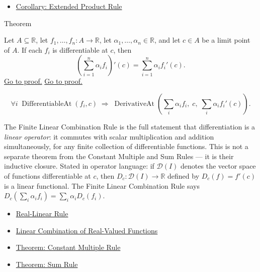 \begin{dependencies}
\begin{itemize}
  \item \hyperref[cor:extended-product-rule]{Corollary: Extended Product Rule}
\end{itemize}
\end{dependencies}


\begin{theorembox}{Theorem}
\begin{theorem}
\label{thm:finite-linear-combination-rule}
Let $A \subseteq \mathbb{R}$, let $f_1, \dots, f_n : A \to \mathbb{R}$, let $\alpha_1, \dots, \alpha_n \in \mathbb{R}$, and let $c \in A$ be a limit point of $A$. If each $f_i$ is differentiable at $c$, then
\[
\left(\sum_{i=1}^{n} \alpha_i f_i\right)'(c) = \sum_{i=1}^{n} \alpha_i f_i'(c).
\]
\hyperref[prf:finite-linear-combination]{Go to proof.}
\hyperref[prf:finite-linear-combination-rule]{Go to proof.}
\end{theorem}
\end{theorembox}

\begin{remark*}
\[
\forall i\;\operatorname{DifferentiableAt}(f_i,c)
\;\Rightarrow\;
\operatorname{DerivativeAt}\!\left(\textstyle\sum_i\alpha_i f_i,\;c,\;\textstyle\sum_i\alpha_i f_i'(c)\right).
\]
\end{remark*}

\begin{remark*}[Interpretation]
The Finite Linear Combination Rule is the full statement that differentiation is a \emph{linear operator}: it commutes with scalar multiplication and addition simultaneously, for any finite collection of differentiable functions. This is not a separate theorem from the Constant Multiple and Sum Rules — it is their inductive closure. Stated in operator language: if $\mathcal{D}(I)$ denotes the vector space of functions differentiable at $c$, then $D_c : \mathcal{D}(I) \to \mathbb{R}$ defined by $D_c(f) = f'(c)$ is a linear functional. The Finite Linear Combination Rule says $D_c(\sum_i \alpha_i f_i) = \sum_i \alpha_i D_c(f_i)$.
\end{remark*}

\begin{dependencies}
\begin{itemize}
  \item \hyperref[def:real-linear-rule]{Real-Linear Rule}
  \item \hyperref[def:linear-combination-of-real-valued-functions]{Linear Combination of Real-Valued Functions}
  \item \hyperref[thm:constant-multiple-rule]{Theorem: Constant Multiple Rule}
  \item \hyperref[thm:sum-rule]{Theorem: Sum Rule}
\end{itemize}
\end{dependencies}

